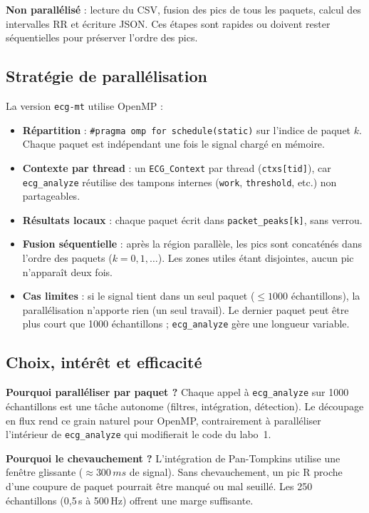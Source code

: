 \documentclass[a4paper,12pt]{article}
\begin{document}
\textbf{Non parallélisé} : lecture du CSV, fusion des pics de tous les paquets, calcul des intervalles RR et écriture JSON. Ces étapes sont rapides ou doivent rester séquentielles pour préserver l'ordre des pics.

\subsection{Stratégie de parallélisation}

La version \texttt{ecg-mt} utilise OpenMP :

\begin{itemize}
    \item \textbf{Répartition} : \texttt{\#pragma omp for schedule(static)} sur l'indice de paquet $k$. Chaque paquet est indépendant une fois le signal chargé en mémoire.
    \item \textbf{Contexte par thread} : un \texttt{ECG\_Context} par thread (\texttt{ctxs[tid]}), car \texttt{ecg\_analyze} réutilise des tampons internes (\texttt{work}, \texttt{threshold}, etc.) non partageables.
    \item \textbf{Résultats locaux} : chaque paquet écrit dans \texttt{packet\_peaks[k]}, sans verrou.
    \item \textbf{Fusion séquentielle} : après la région parallèle, les pics sont concaténés dans l'ordre des paquets ($k = 0, 1, \ldots$). Les zones utiles étant disjointes, aucun pic n'apparaît deux fois.
    \item \textbf{Cas limites} : si le signal tient dans un seul paquet ($\leq 1000$ échantillons), la parallélisation n'apporte rien (un seul travail). Le dernier paquet peut être plus court que 1000 échantillons ; \texttt{ecg\_analyze} gère une longueur variable.
\end{itemize}

\newpage

\subsection{Choix, intérêt et efficacité}

\textbf{Pourquoi paralléliser par paquet ?} Chaque appel à \texttt{ecg\_analyze} sur 1000 échantillons est une tâche autonome (filtres, intégration, détection). Le découpage en flux rend ce grain naturel pour OpenMP, contrairement à paralléliser l'intérieur de \texttt{ecg\_analyze} qui modifierait le code du labo~1.

\textbf{Pourquoi le chevauchement ?} L'intégration de Pan-Tompkins utilise une fenêtre glissante ($\approx 300\,ms$ de signal). Sans chevauchement, un pic R proche d'une coupure de paquet pourrait être manqué ou mal seuillé. Les 250 échantillons (0{,}5\,s à 500\,Hz) offrent une marge suffisante.
\end{document}

